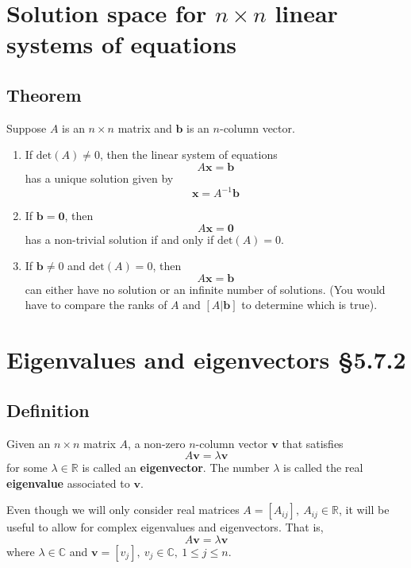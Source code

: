 \documentclass[11pt]{article}
\newcommand{\reals}{\mathbb{R}}
\newcommand{\complex}{\mathbb{C}}
\renewcommand{\vec}[1]{\mathbf{#1}}
\begin{document}
\section{Solution space for $n \times n$ linear systems of equations}
\subsection{Theorem}
Suppose $A$ is an $n \times n$ matrix and $\vec{b}$ is an $n$-column vector.
\begin{enumerate}[ (a) ]
\item If $\text{det}(A) \not = 0$, then the linear system of equations
\[ A \vec{x} = \vec{b} \]
has a unique solution given by
\[ \vec{x} = A^{-1} \vec{b} \]
\item If $\vec{b} = \vec{0}$, then
\[ A \vec{x} = \vec{0} \]
has a non-trivial solution if and only if $\text{det}(A) = 0$.
\item If $\vec{b} \not = 0$ and $\text{det}(A) = 0$, then
\[ A \vec{x} = \vec{b} \]
can either have no solution or an infinite number of solutions. (You would have to compare the ranks of $A$ and $[A|\vec{b}]$ to determine which is true).
\end{enumerate}

\section{Eigenvalues and eigenvectors §5.7.2}
\subsection{Definition}
Given an $n \times n$ matrix $A$, a non-zero $n$-column vector $\vec{v}$ that satisfies
\[ A \vec{v} = \lambda \vec{v} \]
for some $\lambda \in \reals$ is called an \textbf{eigenvector}. The number $\lambda$ is called the real \textbf{eigenvalue} associated to $\vec{v}$.

Even though we will only consider real matrices $A = [A_{ij}],\ A_{ij} \in \reals$, it will be useful to allow for complex eigenvalues and eigenvectors. That is,
\[ A \vec{v} =\lambda \vec{v} \]
where $\lambda \in \complex$ and $\vec{v} = [v_j],\ v_j \in \complex,\ 1 \leq j \leq n$.
\end{document}
